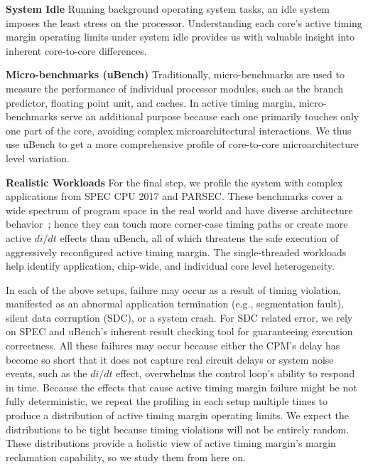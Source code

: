 \textbf{System Idle} Running background operating system tasks, an idle system imposes the least stress on the processor. {Understanding each core's active timing margin operating limits under system idle provides us with valuable insight into inherent core-to-core differences.}

\textbf{Micro-benchmarks (uBench)} Traditionally, micro-benchmarks are used to measure the performance of individual processor modules, such as the branch predictor, floating point unit, and caches. In active timing margin, micro-benchmarks serve an additional purpose because each one primarily touches only one part of the core, avoiding complex microarchitectural interactions. We thus use uBench to get a more comprehensive profile of core-to-core microarchitecture level variation.



\textbf{Realistic Workloads} %
For the final step, we profile the system with complex applications from SPEC CPU 2017 and PARSEC. These benchmarks cover a wide spectrum of program space in the real world and have diverse architecture behavior~\cite{song2018spec,bienia2008parsecsplash}; hence they can touch more corner-case timing paths or create more active $di/dt$ effects than uBench, all of which threatens the safe execution of aggressively reconfigured active timing margin. {The single-threaded workloads help identify application, chip-wide, and individual core level heterogeneity.}

In each of the above setups, failure may occur as a result of timing violation, manifested as an abnormal application termination (e.g., segmentation fault), silent data corruption (SDC), or a system crash. For SDC related error, we rely on SPEC and uBench's inherent result checking tool for guaranteeing execution correctness. All these failures may occur because either the CPM's delay has become so short that it does not capture real circuit delays or system noise events, such as the $di/dt$ effect, overwhelms the control loop's ability to respond in time. Because the effects that cause active timing margin failure might be not fully deterministic, we repeat the profiling in each setup multiple times to produce a distribution of active timing margin operating limits. We expect the distributions to be tight because timing violations will not be entirely random. These distributions provide a holistic view of active timing margin's margin reclamation capability, so we study them from here on.

